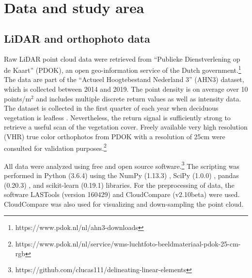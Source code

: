\section{Data and study area}
\subsection{LiDAR and orthophoto data}
Raw LiDAR point cloud data were retrieved from ``Publieke Dienstverlening op de Kaart'' (PDOK), an open geo-information service of the Dutch government.\footnote{https://www.pdok.nl/nl/ahn3-downloads} The data are part of the ``Actueel Hoogtebestand Nederland 3'' (AHN3) dataset, which is collected between 2014 and 2019. The point density is on average over 10 points/m$^2$  and includes multiple discrete return values as well as intensity data. The dataset is collected in the first quarter of each year when deciduous vegetation is leafless \citep{AHN2016inwinjaren}. Nevertheless, the return signal is sufficiently strong to retrieve a useful scan of the vegetation cover. Freely available very high resolution (VHR) true color orthophotos from PDOK with a resolution of 25cm were consulted for validation purposes.\footnote{https://www.pdok.nl/nl/service/wms-luchtfoto-beeldmateriaal-pdok-25-cm-rgb}

All data were analyzed using free and open source software.\footnote{https://github.com/clucas111/delineating-linear-elements} The scripting was performed in Python (3.6.4) using the NumPy (1.13.3) \citep{walt2011numpy}, SciPy (1.0.0) \citep{jones2001scipy}, pandas (0.20.3) \citep{mckinney2010data}, and scikit-learn (0.19.1) \citep{pedregosa2011scikit} libraries. For the preprocessing of data, the software LASTools (version 160429) and CloudCompare (v2.10beta) were used. CloudCompare was also used for visualizing and down-sampling the point cloud.


